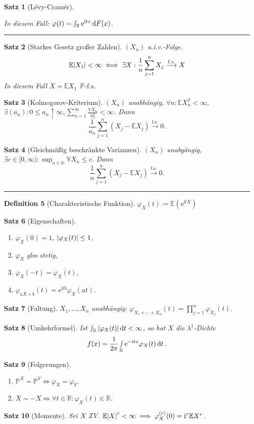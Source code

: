 \documentclass[a4paper,8pt]{article}
\newcounter{Sec}
\theoremstyle{nonumberbreak}
\newtheorem{definition}{Definition}[Sec]
\newtheorem{satz}[definition]{Satz}
\newcommand{\sep}{%
	\rule{\linewidth}{0.15pt}%
	\stepcounter{Sec}%
	}
\newcommand{\defas}{\coloneqq}
\newcommand{\conj}{\overline}
\renewcommand{\P}{\mathbb{P}}
\newcommand{\R}{\mathbb{R}}
\newcommand{\E}{\mathbb{E}}
\newcommand{\V}{\mathbb{V}}
\newcommand{\N}{\mathbb{N}}
\newcommand{\cf}{\varphi}
\newcommand{\e}{\mathrm{e}}
\renewcommand{\i}{\mathrm{i}}
\newcommand{\fsk}{\mathrel{\stackrel{\operatorname{f.s.}}{\longrightarrow}}}
\newcommand{\fs}[1]{~\operatorname{#1-f.s.}}
\begin{document}
\begin{multicols}{3}
\begin{satz}[Lévy-Cramér]
\begin{enumerate}[label=(\alph*)]
		\end{enumerate}
		In diesem Fall: $\cf(t)=\smallint_\R\e^{\i tx}\dd{F(x)}$.
	\end{satz}
	\sep
	\begin{satz}[Starkes Gesetz großer Zahlen]
		$(X_n)$ u.i.v.-Folge.
		\[
			\E\abs{X_1}<\infty\iff
			\exists X:\frac{1}{n}\sum_{j=1}^nX_j\fsk X
		\]
		In diesem Fall $X=\E X_1 \fs{\P}$
	\end{satz}
	\begin{satz}[Kolmogorov-Kriterium]
		$(X_n)$ unabhängig, $\forall n:\E X_n^2<\infty$, $\exists (a_n): 0\le a_n\uparrow\infty, \displaystyle\sum_{n=1}^\infty \frac{\V X_n}{a_n^2}<\infty$.
		Dann
		\vspace{-1.5em}
		\[\frac{1}{a_n}\sum_{j=1}^n(X_j-\E X_j)\fsk 0.\]
	\end{satz}
	\begin{satz}[Gleichmäßig beschränkte Varianzen]
		$(X_n)$ unabgängig, $\exists c\in[0,\infty):\sup_{n\in\N}\V X_n\leq c$. Dann
		\[\frac{1}{n}\sum_{j=1}^n(X_j-\E X_j)\fsk 0.\]
	\end{satz}
	\sep
	\begin{definition}[Charakteristische Funktion]
		$
			\cf_X(t)\defas \E(\e^{\i tX})
		$
	\end{definition}
	\begin{satz}[Eigenschaften]
		{\setlength{\columnseprule}{0pt}\begin{multicols}{2}
		\begin{enumerate}[label=(\alph*)]
			\item $\cf_X(0)=1$, $\abs{\cf_X(t)}\leq 1$,
			\item $\cf_X$ glm stetig,
			\item $\cf_X(-t) = \conj{\cf_X(t)}$,
			\item $\cf_{aX+b}(t) = \e^{\i tb}\cf_X(at)$.
		\end{enumerate}
		\end{multicols}}
	\end{satz}
	\begin{satz}[Faltung]
		$X_1,\ldots,X_n$ unabhängig: $\cf_{X_1+\cdots+X_n}(t)=\prod_{j=1}^n\cf_{X_j}(t)$.
	\end{satz}
	\begin{satz}[Umkehrformel]
		Ist $\smallint_\R\abs{\cf_X(t)}\dd{t}<\infty$, so hat $X$ die
		$\lambda^1$-Dichte \[f(x) = \frac{1}{2\pi}\smallint_\R\e^{-\i tx}\cf_X(t)\dd{t}.\]
	\end{satz}
	\begin{satz}[Folgerungen]
		\begin{enumerate}[label=(\alph*)]
			\item $\P^X=\P^Y\iff\cf_X=\cf_Y$.
			\item $X\sim -X\iff \forall t\in\R:\cf_X(t)\in\R$.
		\end{enumerate}
	\end{satz}
	\begin{satz}[Momente]
		Sei $X$ ZV. $\E \abs{X}^r < \infty \implies \cf_X^{(r)}(0) = \i^r \E X^r$.
		

\end{satz}
\end{multicols}
\end{document}
